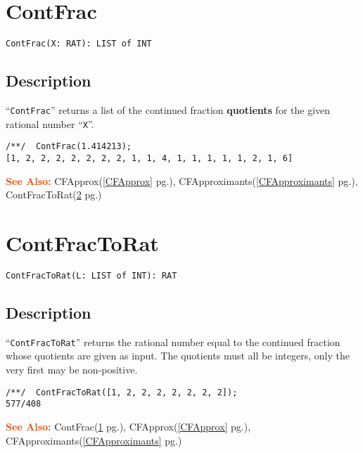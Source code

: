 \documentclass[a4paper]{mybook}
\newenvironment{command}{}{} %
\newcommand\SeeAlso{\par\textcolor{OrangeRed}{\textbf{\large See Also: }}}
\begin{document}
\section{ContFrac}
\label{ContFrac}
\begin{command} %


\begin{Verbatim}[label=syntax, rulecolor=\color{MidnightBlue},
frame=single]
ContFrac(X: RAT): LIST of INT
\end{Verbatim}


\subsection*{Description}

``\verb&ContFrac&'' returns a list of the continued fraction \textbf{quotients}
for the given rational number ``\verb&X&''.
\begin{Verbatim}[label=example, rulecolor=\color{PineGreen}, frame=single]
/**/  ContFrac(1.414213);
[1, 2, 2, 2, 2, 2, 2, 2, 1, 1, 4, 1, 1, 1, 1, 1, 2, 1, 6]
\end{Verbatim}


\SeeAlso %
  CFApprox(\ref{CFApprox} pg.\pageref{CFApprox}), 
    CFApproximants(\ref{CFApproximants} pg.\pageref{CFApproximants}), 
    ContFracToRat(\ref{ContFracToRat} pg.\pageref{ContFracToRat})
\end{command} %

\section{ContFracToRat}
\label{ContFracToRat}
\begin{command} %


\begin{Verbatim}[label=syntax, rulecolor=\color{MidnightBlue},
frame=single]
ContFracToRat(L: LIST of INT): RAT
\end{Verbatim}


\subsection*{Description}

``\verb&ContFracToRat&'' returns the rational number equal to the continued
fraction whose quotients are given as input.  The quotients must all be
integers, only the very first may be non-positive.
\begin{Verbatim}[label=example, rulecolor=\color{PineGreen}, frame=single]
/**/  ContFracToRat([1, 2, 2, 2, 2, 2, 2, 2]);
577/408
\end{Verbatim}


\SeeAlso %
  ContFrac(\ref{ContFrac} pg.\pageref{ContFrac}), 
    CFApprox(\ref{CFApprox} pg.\pageref{CFApprox}), 
    CFApproximants(\ref{CFApproximants} pg.\pageref{CFApproximants})
\end{command} %
\end{document}
